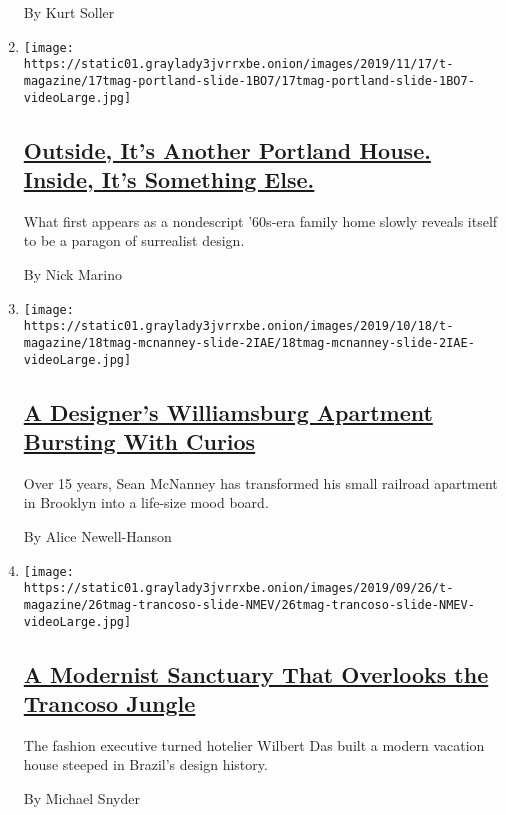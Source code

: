 \begin{enumerate}
  By Kurt Soller
\item
  \texttt{[image: https://static01.graylady3jvrrxbe.onion/images/2019/11/17/t-magazine/17tmag-portland-slide-1BO7/17tmag-portland-slide-1BO7-videoLarge.jpg]}

  \hypertarget{outside-its-another-portland-house-inside-its-something-else}{%
  \subsection{\texorpdfstring{\href{/2019/11/05/t-magazine/portland-house-allie-furlotti-osmose-design.html}{Outside,
  It's Another Portland House. Inside, It's Something
  Else.}}{Outside, It's Another Portland House. Inside, It's Something Else.}}\label{outside-its-another-portland-house-inside-its-something-else}}

  What first appears as a nondescript '60s-era family home slowly
  reveals itself to be a paragon of surrealist design.

  By Nick Marino
\item
  \texttt{[image: https://static01.graylady3jvrrxbe.onion/images/2019/10/18/t-magazine/18tmag-mcnanney-slide-2IAE/18tmag-mcnanney-slide-2IAE-videoLarge.jpg]}

  \hypertarget{a-designers-williamsburg-apartment-bursting-with-curios}{%
  \subsection{\texorpdfstring{\href{/2019/10/18/t-magazine/sean-mcnanney.html}{A
  Designer's Williamsburg Apartment Bursting With
  Curios}}{A Designer's Williamsburg Apartment Bursting With Curios}}\label{a-designers-williamsburg-apartment-bursting-with-curios}}

  Over 15 years, Sean McNanney has transformed his small railroad
  apartment in Brooklyn into a life-size mood board.

  By Alice Newell-Hanson
\item
  \texttt{[image: https://static01.graylady3jvrrxbe.onion/images/2019/09/26/t-magazine/26tmag-trancoso-slide-NMEV/26tmag-trancoso-slide-NMEV-videoLarge.jpg]}

  \hypertarget{a-modernist-sanctuary-that-overlooks-the-trancoso-jungle}{%
  \subsection{\texorpdfstring{\href{/2019/09/26/t-magazine/trancoso-brazil-house.html}{A
  Modernist Sanctuary That Overlooks the Trancoso
  Jungle}}{A Modernist Sanctuary That Overlooks the Trancoso Jungle}}\label{a-modernist-sanctuary-that-overlooks-the-trancoso-jungle}}

  The fashion executive turned hotelier Wilbert Das built a modern
  vacation house steeped in Brazil's design history.

  By Michael Snyder
\end{enumerate}

